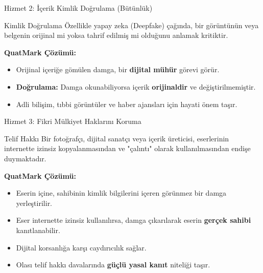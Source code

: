 \documentclass[aspectratio=169,xcolor={dvipsnames}]{beamer}
\begin{document}
\begin{frame}{Hizmet 2: İçerik Kimlik Doğrulama (Bütünlük)}

\begin{block}{Kimlik Doğrulama}
Özellikle yapay zeka (Deepfake) çağında, bir görüntünün veya belgenin orijinal mi yoksa tahrif edilmiş mi olduğunu anlamak kritiktir.
\end{block}
\textbf{QuatMark Çözümü:}
\begin{itemize}
\item Orijinal içeriğe gömülen damga, bir \textbf{dijital mühür} görevi görür.
\item \textbf{Doğrulama:} Damga okunabiliyorsa içerik \textbf{orijinaldir} ve değiştirilmemiştir.
\item Adli bilişim, tıbbi görüntüler ve haber ajansları için hayati önem taşır.
\end{itemize}


\end{frame}

\begin{frame}{Hizmet 3: Fikri Mülkiyet Haklarını Koruma}

\begin{block}{Telif Hakkı}
Bir fotoğrafçı, dijital sanatçı veya içerik üreticisi, eserlerinin internette izinsiz kopyalanmasından ve "çalıntı" olarak kullanılmasından endişe duymaktadır.
\end{block}
\textbf{QuatMark Çözümü:}
\begin{itemize}
\item Eserin içine, sahibinin kimlik bilgilerini içeren görünmez bir damga yerleştirilir.
\item Eser internette izinsiz kullanılırsa, damga çıkarılarak eserin \textbf{gerçek sahibi} kanıtlanabilir.
\item Dijital korsanlığa karşı caydırıcılık sağlar.
\item Olası telif hakkı davalarında \textbf{güçlü yasal kanıt} niteliği taşır.
\end{itemize}

\end{frame}
\end{document}
